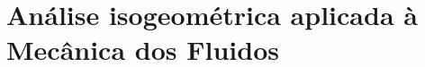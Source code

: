 \documentclass[tese_patricia]{subfiles}
\begin{document}
\chapter[Análise isogeométrica aplicada à Mecânica dos Fluidos]{Análise isogeométrica aplicada à Mecânica dos Fluidos} \label{capitulo:Cap3}

\end{document}
